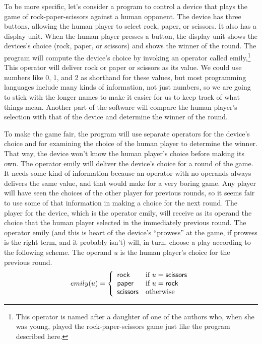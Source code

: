 To be more specific, let's consider a program to control
a device that plays the game of rock-paper-scissors against a human opponent.
The device has three buttons, allowing the human player to select rock, paper, or
scissors.  It also has a display unit.
When the human player presses a button,
the display unit shows the devices's choice (rock, paper, or scissors)
and shows the winner of the round.
The program will compute the device's choice
by invoking an operator called \textsf{emily},\footnote{This operator is
named after a daughter of one of the authors who, when she was young,
played the rock-paper-scissors game just like the program described here.}
This operator will deliver
rock or paper or scissors as its value.
We could use numbers like 0, 1, and 2 as shorthand for these values,
but most programming languages include many
kinds of information, not just numbers,
so we are going to stick with the longer names
to make it easier for us to keep track of what things mean.
Another part of the software will compare the human player's
selection with that of the device and determine the winner of the round.

To make the game fair, the program will use
separate operators for the device's choice and
for examining the choice of the human player to determine the winner.
That way, the device won't know the human player's choice before making its own.
The operator \textsf{emily} will deliver the device's choice for a round of the game.
It needs some kind of information because an operator with no operands
always delivers the same value, and that would make for a very boring game.
Any player will have seen the choices of the other player for
previous rounds, so it seems fair to use some of that information in
making a choice for the next round.
The player for the device, which is the operator \textsf{emily}, 
will receive as its operand the choice that the human player selected
in the immediately previous round.
The operator \textsf{emily} 
(and this is heart of the device's ``prowess''
at the game, if prowess is the right term, and it probably isn't) 
will, in turn, choose a play according to the following scheme.
The operand $u$ is the human player's choice for the previous round.
\begin{displaymath}
emily(u) =
   \left\{
        \begin{array}{ll}
        \mbox{\textsf{rock}}     & \mbox{if } u = \mbox{\textsf{scissors}} \\
        \mbox{\textsf{paper}}    & \mbox{if } u = \mbox{\textsf{rock}} \\
        \mbox{\textsf{scissors}} & \mbox{otherwise}
        \end{array}
   \right.
\end{displaymath}

